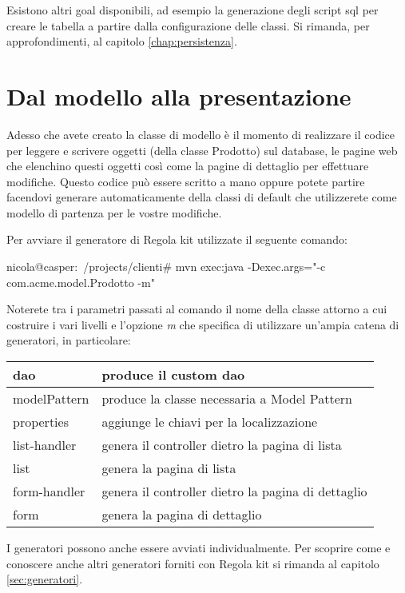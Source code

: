 \begin{nota}
Esistono altri goal disponibili, ad esempio la generazione degli script sql per creare le tabella a partire dalla configurazione delle classi. Si rimanda, per approfondimenti, al capitolo \vref{chap:persistenza}.
\end{nota}

\section{Dal modello alla presentazione}
Adesso che avete creato la classe di modello è il momento di realizzare il codice per leggere e scrivere oggetti (della classe Prodotto) sul database, le pagine web che elenchino questi oggetti così come la pagine di dettaglio per effettuare modifiche. Questo codice può essere scritto a mano oppure potete partire facendovi generare automaticamente della classi di default che utilizzerete come modello di partenza per le vostre modifiche.

 Per avviare il generatore di Regola kit utilizzate il seguente comando:

\begin{bash}
nicola@casper:~/projects/clienti# mvn exec:java -Dexec.args="-c com.acme.model.Prodotto -m"
\end{bash}

Noterete tra i parametri passati al comando il nome della classe attorno a cui costruire i vari livelli e l'opzione \emph{m} che specifica di utilizzare un'ampia catena di generatori, in particolare:

\begin{center}
{
  \begin{tabular}{ | l | p{9cm} | }
  \hline
  dao &  produce il custom dao \\ \hline
  modelPattern & produce la classe necessaria a Model Pattern   \\ \hline
  properties & aggiunge le chiavi per la localizzazione \\ \hline
  list-handler & genera il controller dietro la pagina di lista \\ \hline
  list &  genera la pagina di lista\\ \hline
  form-handler & genera il controller dietro la pagina di dettaglio\\ \hline
  form &  genera la pagina di dettaglio \\ \hline
  \end{tabular}
}
\end{center}

\begin{nota}
I generatori possono anche essere avviati individualmente. Per scoprire come e conoscere anche altri generatori forniti con Regola kit si rimanda al capitolo \vref{sec:generatori}.
\end{nota}







